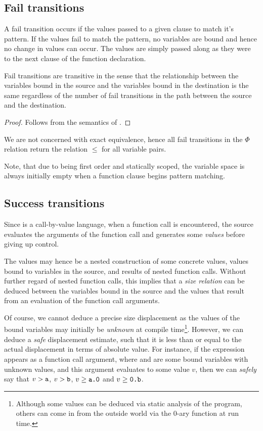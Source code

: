 \subsection{Fail transitions}

A fail transition occurs if the values passed to a given clause to match it's
pattern. If the values fail to match the pattern, no variables are bound and
hence no change in values can occur. The values are simply passed along as they
were to the next clause of the function declaration.

\begin{lemma} Fail transitions are transitive in the sense that the
relationship between the variables bound in the source and the variables bound
in the destination is the same regardless of the number of fail transitions in
the path between the source and the destination.\end{lemma}

\begin{proof} Follows from the semantics of \D{}. \end{proof}

We are not concerned with exact equivalence, hence all fail transitions in the
$\Phi$ relation return the relation $\leq$ for all variable pairs.

Note, that due to \D{} being first order and statically scoped, the variable
space is always initially empty when a function clause begins pattern matching.

\subsection{Success transitions}

Since \D{} is a call-by-value language, when a function call is encountered,
the source evaluates the arguments of the function call and generates some
\emph{values} before giving up control.

The values may hence be a nested construction of some concrete values, values
bound to variables in the source, and results of nested function calls. Without
further regard of nested function calls, this implies that a \emph{size
relation} can be deduced between the variables bound in the source and the
values that result from an evaluation of the function call arguments. 

Of course, we cannot deduce a precise size displacement as the values of the
bound variables may initially be \emph{unknown} at compile
time\footnote{Although some values can be deduced via static analysis of the
program, others can come in from the outside world via the 0-ary function
 at run time.}.  However, we can deduce a \emph{safe} displacement
estimate, such that it is less than or equal to the actual displacement in
terms of absolute value. For instance, if the expression  appears as
a function call argument, where  and  are some bound variables
with unknown values, and this argument evaluates to some value $v$, then we can
\emph{safely} say that $v>\text{{\ttfamily a}}$, $v>\text{{\ttfamily b}}$,
$v\geq\text{{\ttfamily a.0}}$ and $v\geq\text{{\ttfamily0.b}}$.

